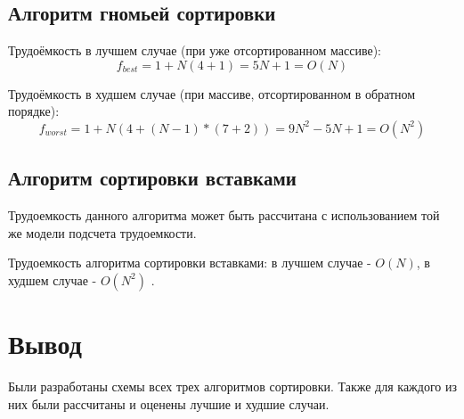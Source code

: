 \subsection{Алгоритм гномьей сортировки}

Трудоёмкость в лучшем случае (при уже отсортированном массиве):
\begin{equation}
	\label{for:gnome_best}
    f_{best} = 1 + N(4 + 1) = 5N + 1 = O(N)
\end{equation}

Трудоёмкость в худшем случае (при массиве, отсортированном в обратном порядке):
\begin{equation}
	\label{for:gnome_worst}
    f_{worst} = 1 + N(4 + (N - 1) * (7 + 2)) = 9N^2 - 5N + 1 = O(N^2)
\end{equation}


\subsection{Алгоритм сортировки вставками}
Трудоемкость данного алгоритма может быть рассчитана с использованием той же модели подсчета трудоемкости.

Трудоемкость алгоритма сортировки вставками: в лучшем случае - $O(N)$, в худшем случае - $O(N^2)$ \cite{insert-sort}. \newline

\section*{Вывод}

Были разработаны схемы всех трех алгоритмов сортировки. Также для каждого из них были рассчитаны и оценены лучшие и худшие случаи.
